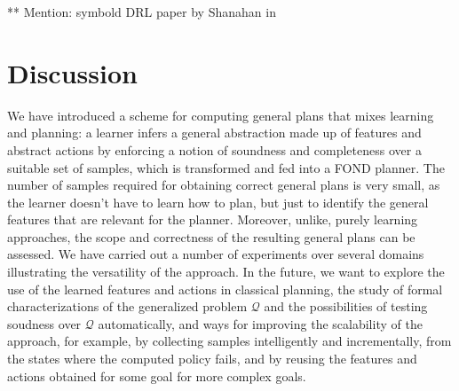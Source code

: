 \documentclass[letterpaper]{article} %
\newcommand{\Omit}[1]{}
\newcommand{\Q}{\mathcal{Q}}
\begin{document}
** Mention: symbold DRL paper by Shanahan in 

\section{Discussion}

We have introduced a scheme for computing general plans that mixes learning and planning: a learner infers
a general abstraction made up of features and abstract actions by enforcing  a notion of soundness and completeness
over a suitable set of samples, which is transformed and fed into a FOND planner.
The number of samples required for obtaining correct general plans is very small,
as the learner doesn't have to learn how to plan,  but just to identify the
general features that are relevant for the planner. Moreover, unlike, purely
learning approaches, the scope and correctness of the resulting general plans
can be assessed.  We have carried out a number of experiments over several
domains illustrating the versatility of the approach. In the future, we
want to explore the use of the learned  features and actions
in classical planning, the study of  formal characterizations
of the generalized problem $\Q$ and  the possibilities
of testing soudness over $\Q$ automatically, and ways
for improving the scalability of the approach, for example,
by collecting samples intelligently and incrementally,
from the states where the computed  policy fails,
and by reusing the features and actions obtained
for some goal for more complex goals.

\Omit{


** discussion  of experiments; things we do well and not, scope, lessons. limitations (expressive? scalability?)

** briefly related work, expanding paragraph in intro.

** summary and cconlusions
}



\end{document}
